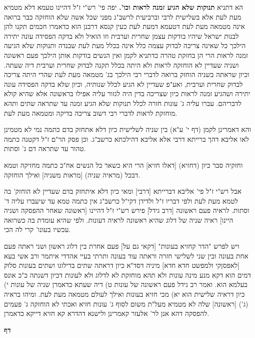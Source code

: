 \documentclass[12pt, openany]{book}
\newcommand{\chapname}{}
\newcommand{\newchap}[1]{
	\addcontentsline{toc}{chapter}{#1}
	\renewcommand{\chapname}{#1}
		\begin{center}
			\textbf{%
\fontsize{16pt}{16pt}\selectfont
				#1}
		\end{center}
}
\begin{document}
{\par הא דתניא \textbf{תנוקות שלא הגיע זמנה לראות וכו'.}  יפה פי' רש"י ז"ל דהיינו טעמא דלא מטמיא מעת לעת אלא בשלישית לרבי וברביעית לרשב"ג מפני שכל אשה שלא הוחזקה כבר ברואה אינה מטמאה מעת לעת דטעמא דמעת לעת כעין קנסא דרבנן הוא כדאמרו חכמים תקנו להן לבנות ישראל שיהיו בודקות עצמן שחרית וערבית וזו הואיל ולא בדקה הפסידה עונה יתירה הילכך כל שאינה צריכה לבדוק עצמה כלל אינה בכלל מעת לעת שבנדה ותנוקות שלא הגיעה זמנה לראות הרי הן בחזקת טהרה כדתניא לקמן ואין הנשים בודקות אותן הילכך פעם ראשונה ושניה שעדיין לא הוחזקה לראות ולא היתה בכלל תקנה לבדוק שחרית וערבית דיה שעתה. וכיון שראתה בשניה הוחזק ברואה לדברי רבי הילכך בג' מטמאה מעת לעת שהרי היתה צריכה לבדוק שחרית וערבית, ואע"פ שעדיין לא הגיע לכלל שנותיה, וכיון שלא בדקה הפסידה עונה יתירה ושהגיע זמנה לראות כיון שצריכה בדין היה לגזור עליה אפילו בראשונה אלא שהיא קולא לדבריהם. עברו עליה ג' עונות חזרה לכלל תנוקות שלא הגיע זמנה עד שתראה שתים ותהא מוחזקת לראות לדברי רבי דשוב צריכה בדיקה ומטמאה מעת לעת.\par  והא דאמרינן לקמן (דף י' ע"א) בין שניה לשלישית כיון דלא אתחזק בדם כתמה נמי לא מטמינן לאו אליבא דהך ברייתא דרבי אלא אליבא דהילכתא כרשב"ג. וכן פסק הר"ם ז"ל דקטנה כתמה טהור עד שתראה דם ג' וסתות.\par  וחזקיה סבר כיון (דחזיא) [דאלו חזיא] הרי היא כשאר כל הנשים אח"כ כתמה מחזיקה וטמא דבכל (מראיה שניה) [מראות משניה] ואילך הוחזקה.\par  אבל רש"י ז"ל פי' אליבא דברייתא [דרבי] ומאי כיון דלא איתחזק בדם שעדיין לא הוחזק' בה לטמא מעת לעת ולפי דבריו ז"ל ולדידן דקי"ל כרשב"ג אין כתמה טמא עד שיעברו עליה ד' וסתות. לראיה פעם ראשונה [דרב גידל] פירש רש"י ז"ל דהיינו [ראשונה שאחר ההפסקה ושניה היינו] ראיה שניה של דלוג שהיא ראשונה לראיה דעונות. ולפי שהיא עומדת בה כשרואה עכשיו בעונו' קרי לה הכי.\par  ויש לפרש "הדר קחזיא בעונות" [דקאי גם על] פעם אחרת בין דלוג ראשון ושני ראתה פעם אחת בעונה ובין שני לשלישי חזרה וראתה עוד בעונה ותרתי בעיי אהדדי איתמר ורב אשי בעא [לאפסןקי ולמפשט חדא חדא] מיניה דסד"א כיון דראתה שתים בדילוגו ושתים בעונות סלוק דמים הוא דקא מנע מינה עונות ולא תהא מוחזקת לא לדלוג ולא לעונות דכיון דשנתה כ"כ אונס בעלמא הוא. ואמר רב גידל פעם ראשונה של עונות ט) דיה שעתא כדאמרן שניה של עונות י) כיון דראיה שלישית הוא יא) מכי חזיא בעונות ואילך לעולם מטמאה מעת לעת. ומיהו בראיה (ג') [ראשונה] שלה לא מטמיא מעל"ת משום לסוף ג' עונות חזיא ואכתי לא הוחזקה ג' פעמים להפסקה דהא אנן לר' אלעזר קאמרינן ולישנא דהדרא קא חזיא דייקא כדאמרן. 
\par}
\newchap{דף }
\end{document}

